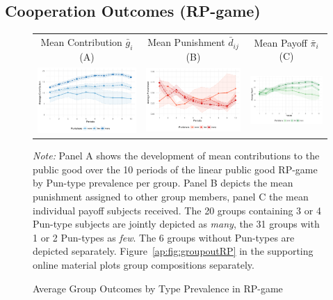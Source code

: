 \documentclass[11pt,a4paper]{article}
\begin{document}
\begin{refsection}
\subsection{Cooperation Outcomes (RP-game)}
\begin{figure}[tbp]
  \centering
  \begin{tabular}{|c |c | c|}
    \hline
    Mean Contribution $\bar{g}_i$ (A)&
        Mean Punishment $\bar{d}_{ij}$ (B)& 
            Mean Payoff $\bar{\pi}_i$ (C)\\
    [.3em]
    \includegraphics[width=.32\linewidth]{img/21_contrib} &
        \includegraphics[width=.32\linewidth]{img/21_pun} &
            \includegraphics[width=.32\linewidth]{img/21_payoff}\\
    \hline
  \end{tabular}
  \caption{Average Group Outcomes by Type Prevalence in RP-game}
  \label{fig:groupoutRP}
  \smallskip
  \parbox{\linewidth}{\footnotesize\textit{Note:} Panel A shows the development
    of mean contributions to the public good over the 10 periods of the linear
    public good RP-game by Pun-type prevalence per group. Panel B depicts the
    mean punishment assigned to other group members, panel C the mean individual
  payoff subjects received. The 20 groups containing 3 or 4 Pun-type subjects
  are jointly depicted as \emph{many}, the 31 groups with 1 or 2 Pun-types as
  \emph{few}. The 6 groups without Pun-types are depicted separately.
  Figure~\ref{ap:fig:groupoutRP} in the supporting online material plots
  group compositions separately.}
\end{figure}


\end{refsection}
\end{document}
